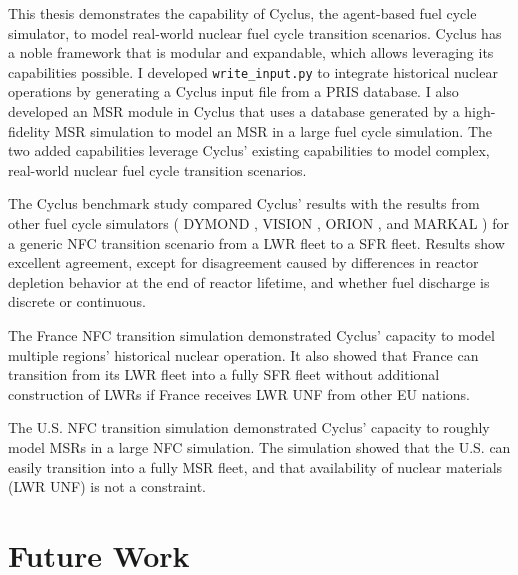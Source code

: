 This thesis demonstrates the capability of Cyclus, the agent-based
fuel cycle simulator, to model real-world nuclear fuel cycle
transition scenarios. Cyclus has a noble framework that is
modular and expandable, which allows leveraging its capabilities
possible.
I developed \texttt{write\_input.py}
to integrate historical nuclear operations by generating
a Cyclus input file from a \gls{PRIS} database. I also
developed an \gls{MSR} module in Cyclus that uses a database
generated by a high-fidelity \gls{MSR} simulation to model
an \gls{MSR} in a large fuel cycle simulation. The two
added capabilities leverage Cyclus' existing capabilities
to model complex, real-world nuclear fuel cycle transition
scenarios.

The Cyclus benchmark study compared Cyclus' results with
the results from other fuel cycle simulators
(
DYMOND \cite{yacout_modeling_2005},
VISION \cite{jacobson_verifiable_2010},
ORION \cite{gregg_analysis_2012}, and
MARKAL \cite{shay_epa_2006}
) for a generic \gls{NFC} transition scenario from a
\gls{LWR} fleet to a \gls{SFR} fleet. Results show
excellent agreement, except for disagreement caused 
by differences in reactor depletion
behavior at the end of reactor lifetime, and
whether fuel discharge is discrete or continuous.

The France \gls{NFC} transition simulation demonstrated
Cyclus' capacity to model multiple regions' historical
nuclear operation. It also showed that
France can transition from its \gls{LWR} fleet into a fully \gls{SFR} fleet
without additional construction of \glspl{LWR} if France receives
\gls{LWR} \gls{UNF} from other \gls{EU} nations.

The U.S. \gls{NFC} transition simulation demonstrated
Cyclus' capacity to roughly model \glspl{MSR} in
a large \gls{NFC} simulation. The simulation showed
that the U.S. can easily transition into a fully
\gls{MSR} fleet, and that availability of nuclear materials
(\gls{LWR} \gls{UNF}) is not a constraint.



\section{Future Work}
